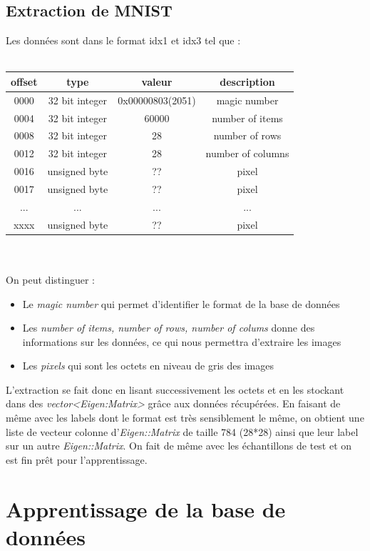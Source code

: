 \subsection{Extraction de MNIST} 
Les données sont dans le format idx1 et idx3 tel que : \\ \\
\begin{tabular}{|c | c | c | c|}
\hline
\textbf{offset} & \textbf{type} & \textbf{valeur} & \textbf{description} \\
\hline
0000 & 32 bit integer & 0x00000803(2051) & magic number\\
0004 & 32 bit integer & 60000 & number of items\\
0008 & 32 bit integer & 28 & number of rows \\
0012 & 32 bit integer & 28 & number of columns \\
0016 & unsigned byte & ?? & pixel\\
0017 & unsigned byte & ?? & pixel\\
... & ... & ... & ... \\
xxxx  &  unsigned byte & ?? & pixel\\
\hline
\end{tabular} \\ \\
On peut distinguer :
\begin{itemize}
  \item Le \textit{magic number} qui permet d'identifier le format de la base de données
  \item Les \textit{number of items, number of rows, number of colums} donne des informations sur les données, ce qui nous permettra d'extraire les images
  \item Les \textit{pixels} qui sont les octets en niveau de gris des images
\end{itemize} 
L'extraction se fait donc en lisant successivement les octets et en les stockant dans des \textit{vector<Eigen:Matrix>} grâce aux données récupérées. En faisant de même avec les labels dont le format est très sensiblement le même, on obtient une liste de vecteur colonne d'\textit{Eigen::Matrix} de taille 784 (28*28) ainsi que leur label sur un autre \textit{Eigen::Matrix}. On fait de même avec les échantillons de test et on est fin prêt pour l'apprentissage.

\section{Apprentissage de la base de données}
